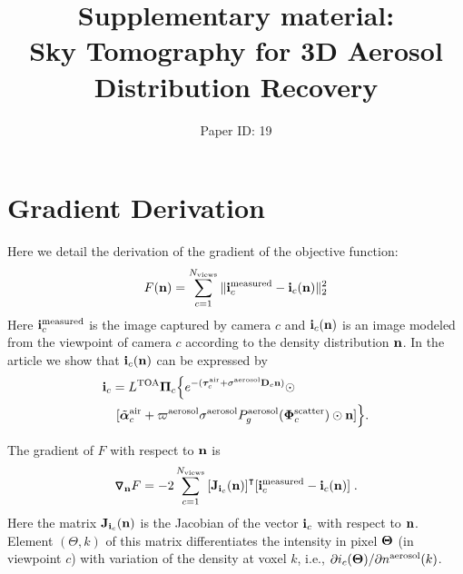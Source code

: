 \documentclass[a4paper]{article}
\newcommand{\Grad}[1]{\bm{\triangledown_{#1}}}
\newcommand{\vect}[1]{\bm{#1}}
\newcommand{\transpose}[1]{{#1}^\intercal}
\begin{document}
\title{\vspace{-2cm}Supplementary material: \\Sky Tomography for 3D Aerosol Distribution Recovery}
\author{Paper ID: 19}
\date{}

\maketitle

\section{Gradient Derivation}
\label{sec:gradient-derivation}

Here we detail the derivation of the gradient of the objective
function:
\begin{equation}
  \label{eq:objectiveA}
  F({\bf n})
  = \sum_{c=1}^{N_{\rm views}}
  \| {\bf i}^{\rm measured}_c - {\bf i}_c({\bf n})\|^2_2
\end{equation}
Here ${\bf i}^{\rm measured}_c$ is the image captured by camera $c$
and ${\bf i}_c({\bf n})$ is an image modeled from the viewpoint of
camera $c$ according to the density distribution ${\bf n}$. In the
article we show that ${\bf i}_c({\bf n})$ can be expressed by
\begin{align}
  {\bf i}_c= L^{\rm TOA} {\vect{\Pi}}_c \Big\{ e^{-(\vect{\tau}_c^{\rm
      air} + {\sigma}^{\rm aerosol} {\bf D}_c {\bf n}) }\odot
  \;\;\;\;\;\;\;\;\;\;\;\;\;\;\;\;\;\;\;\;\;
  \nonumber \\
  [\tilde{\vect{\alpha}}^{\rm air}_c + %
  \varpi^{\rm aerosol}\sigma^{\rm aerosol} P^{\rm
    aerosol}_g(\vect{\Phi}^{\rm scatter}_c) \odot{\bf n} ] \Big\} .
  \label{eq:bigIA}
\end{align}

The gradient of $F$ with respect to ${\bf n}$ is
\begin{align}
  \Grad{{\bf n}} F = -2\sum_{c=1}^{N_{\rm views}}
  \transpose{\left[{\bf J}_{{\bf i}_c}({\bf n})\right]} [{\bf i}^{\rm
    measured}_c - {\bf i}_c({\bf n})] \;.
  \label{eq:gradient1}
\end{align}
Here the matrix ${\bf J}_{{\bf i}_c}({\bf n})$ is the Jacobian of the
vector ${\bf i}_c$ with respect to ${\bf n}$. Element $(\Theta,k)$ of
this matrix differentiates the intensity in pixel ${\bf \Theta}$ (in
viewpoint $c$) with variation of the density at voxel $k$, i.e.,
$\partial i_c({\bf \Theta})/\partial{n^{\rm aerosol}(k)}$.
\end{document}
